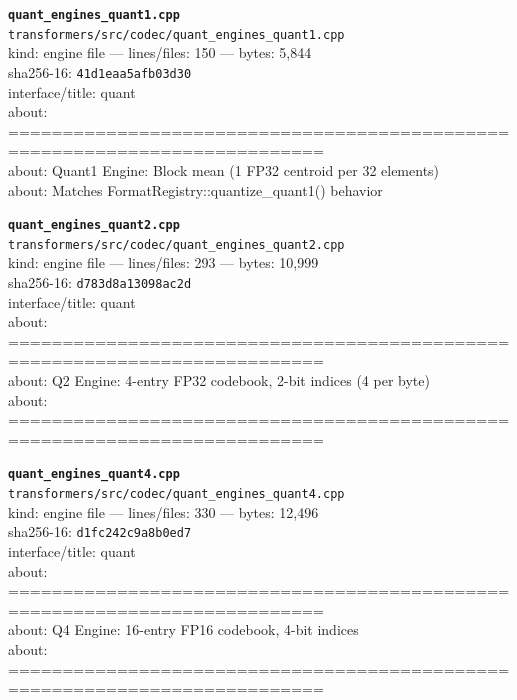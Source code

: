 \noindent\textbf{\texttt{quant\_engines\_quant1.cpp}}\\
\texttt{transformers/src/codec/quant\_engines\_quant1.cpp}\\
kind: engine file --- lines/files: 150 --- bytes: 5,844\\
sha256-16: \texttt{41d1eaa5afb03d30}\\
interface/title: quant\\
about: ===========================================================================\\
about: Quant1 Engine: Block mean (1 FP32 centroid per 32 elements)\\
about: Matches FormatRegistry::quantize\_quant1() behavior\\
\vspace*{6.0pt}

\noindent\textbf{\texttt{quant\_engines\_quant2.cpp}}\\
\texttt{transformers/src/codec/quant\_engines\_quant2.cpp}\\
kind: engine file --- lines/files: 293 --- bytes: 10,999\\
sha256-16: \texttt{d783d8a13098ac2d}\\
interface/title: quant\\
about: ===========================================================================\\
about: Q2 Engine: 4-entry FP32 codebook, 2-bit indices (4 per byte)\\
about: ===========================================================================\\
\vspace*{6.0pt}

\noindent\textbf{\texttt{quant\_engines\_quant4.cpp}}\\
\texttt{transformers/src/codec/quant\_engines\_quant4.cpp}\\
kind: engine file --- lines/files: 330 --- bytes: 12,496\\
sha256-16: \texttt{d1fc242c9a8b0ed7}\\
interface/title: quant\\
about: ===========================================================================\\
about: Q4 Engine: 16-entry FP16 codebook, 4-bit indices\\
about: ===========================================================================\\
\vspace*{6.0pt}


